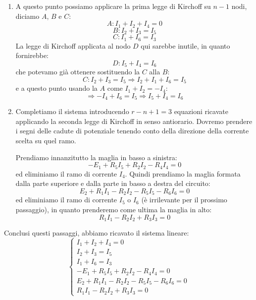 \documentclass[a4paper,11pt]{article}
\begin{document}
\begin{enumerate}
\item A questo punto possiamo applicare la prima legge di Kirchoff su $n-1$ nodi, diciamo $A$, $B$ e $C$:
$$
A: I_1 + I_2 + I_4 = 0 
$$
$$
B: I_2 + I_3 = I_5 
$$
$$
C: I_1 + I_6 = I_3
$$
La legge di Kirchoff applicata al nodo $D$ qui sarebbe inutile, in quanto fornirebbe:
$$
D: I_5 + I_4 = I_6
$$
che potevamo già ottenere sostituendo la $C$ alla $B$:
$$
C: I_2 + I_3 = I_5 \Rightarrow I_2 + I_1 + I_6 = I_5  
$$
e a questo punto usando la $A$ come $I_1 + I_2 = -I_4$:
$$
\Rightarrow -I_4 + I_6 = I_5 \Rightarrow I_5 + I_4 = I_6
$$

\item Completiamo il sistema introducendo $r - n + 1 = 3$ equazioni ricavate applicando la seconda legge di Kirchoff in senso antiorario.
	Dovremo prendere i segni delle cadute di potenziale tenendo conto della direzione della corrente scelta su quel ramo.
	
	Prendiamo innanzitutto la maglia in basso a sinistra:
	$$ -E_1 + R_5 I_5 + R_2 I _2 - R_4 I_4 = 0 $$
	ed eliminiamo il ramo di corrente $I_4$.
	Quindi prendiamo la maglia formata dalla parte superiore e dalla parte in basso a destra del circuito:
	$$ E_2 + R_1 I_1 - R_2 I_2 - R_5 I_5 - R_6 I_6 = 0 $$
	ed eliminiamo il ramo di corrente $I_5$ o $I_6$ (è irrilevante per il prossimo passaggio), in quanto prenderemo come ultima la maglia in alto:
	$$ R_1 I_1 - R_2 I_2 + R_3 I_3 = 0 $$
\end{enumerate}

Conclusi questi passaggi, abbiamo ricavato il sistema lineare:
\[
	\begin{cases}
I_1 + I_2 + I_4 = 0 \\ 
I_2 + I_3 = I_5 \\
I_1 + I_6 = I_3 \\
-E_1 + R_5 I_5 + R_2 I _2 - R_4 I_4 = 0 \\
E_2 + R_1 I_1 - R_2 I_2 - R_5 I_5 - R_6 I_6 = 0 \\
R_1 I_1 - R_2 I_2 + R_3 I_3 = 0
	\end{cases}
\]
\end{document}
